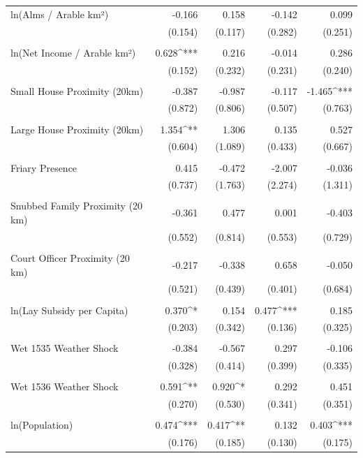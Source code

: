 \begin{table}[H]
\begin{tabular}{@{\extracolsep{.5pt}}lD{.}{.}{-3} D{.}{.}{-3} D{.}{.}{-3} D{.}{.}{-3} }
 ln(Alms / Arable km²) & -0.166 & 0.158 & -0.142 & 0.099 \\ 
  & (0.154) & (0.117) & (0.282) & (0.251) \\ 
  & & & & \\ 
 ln(Net Income / Arable km²) & 0.628^{***} & 0.216 & -0.014 & 0.286 \\ 
  & (0.152) & (0.232) & (0.231) & (0.240) \\ 
  & & & & \\ 
 Small House Proximity (20km) & -0.387 & -0.987 & -0.117 & -1.465^{***} \\ 
  & (0.872) & (0.806) & (0.507) & (0.763) \\ 
  & & & & \\ 
 Large House Proximity (20km) & 1.354^{**} & 1.306 & 0.135 & 0.527 \\ 
  & (0.604) & (1.089) & (0.433) & (0.667) \\ 
  & & & & \\ 
 Friary Presence & 0.415 & -0.472 & -2.007 & -0.036 \\ 
  & (0.737) & (1.763) & (2.274) & (1.311) \\ 
  & & & & \\ 
 Snubbed Family Proximity (20 km) & -0.361 & 0.477 & 0.001 & -0.403 \\ 
  & (0.552) & (0.814) & (0.553) & (0.729) \\ 
  & & & & \\ 
 Court Officer Proximity (20 km) & -0.217 & -0.338 & 0.658 & -0.050 \\ 
  & (0.521) & (0.439) & (0.401) & (0.684) \\ 
  & & & & \\ 
 ln(Lay Subsidy per Capita) & 0.370^{*} & 0.154 & 0.477^{***} & 0.185 \\ 
  & (0.203) & (0.342) & (0.136) & (0.325) \\ 
  & & & & \\ 
 Wet 1535 Weather Shock & -0.384 & -0.567 & 0.297 & -0.106 \\ 
  & (0.328) & (0.414) & (0.399) & (0.335) \\ 
  & & & & \\ 
 Wet 1536 Weather Shock & 0.591^{**} & 0.920^{*} & 0.292 & 0.451 \\ 
  & (0.270) & (0.530) & (0.341) & (0.351) \\ 
  & & & & \\ 
 ln(Population) & 0.474^{***} & 0.417^{**} & 0.132 & 0.403^{***} \\ 
  & (0.176) & (0.185) & (0.130) & (0.175) \\ 

\end{tabular}
\end{table}

